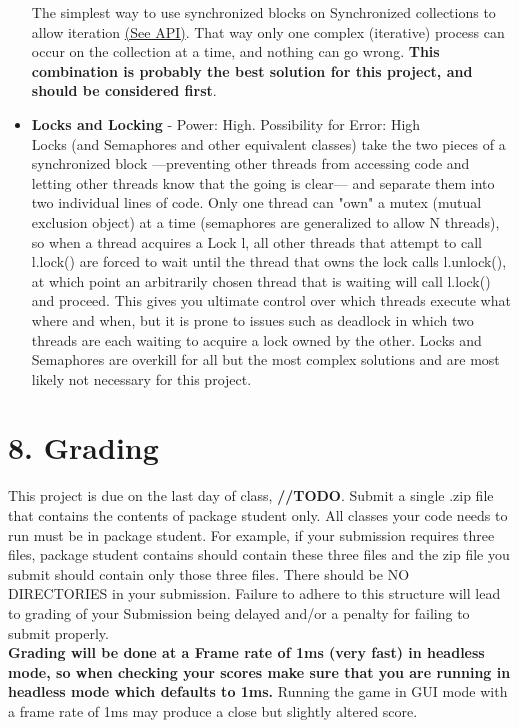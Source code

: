 \documentclass[11pt]{article}
\begin{document}
\begin{itemize}
The simplest way to use synchronized blocks on Synchronized collections to allow iteration \href{http://docs.oracle.com/javase/7/docs/api/java/util/Collections.html\#synchronizedCollection(java.util.Collection)}{({\color{blue}\underline{See API}})}. That way only one complex (iterative) process can occur on the collection at a time, and nothing can go wrong. \textbf{This combination is probably the best solution for this project, and should be considered first}.
\item \textbf{Locks and Locking} - Power: High. Possibility for Error: High\\
Locks (and Semaphores and other equivalent classes) take the two pieces of a synchronized block ---preventing other threads from accessing code and letting other threads know that the going is clear--- and separate them into two individual lines of code. Only one thread can "own" a mutex (mutual exclusion object) at a time (semaphores are generalized to allow N threads), so when a thread acquires a Lock l, all other threads that attempt to call l.lock() are forced to wait until the thread that owns the lock calls l.unlock(), at which point an arbitrarily chosen thread that is waiting will call l.lock() and proceed. This gives you ultimate control over which threads execute what where and when, but it is  prone to issues such as deadlock in which two threads are each waiting to acquire a lock owned by the other. Locks and Semaphores are overkill for all but the most complex solutions and are most likely not necessary for this project. 
\end{itemize}

\section{8. Grading}
This project is due on the last day of class, \textbf{//TODO}.
Submit a single .zip file that contains the contents of package student only. All classes your code needs to run must be in package student.  For example, if your submission requires three files, package student contains should contain these three files and the zip file you submit should contain only those three files.  There should be NO DIRECTORIES in your submission.  Failure to adhere to this structure will lead to grading of your Submission being delayed and/or a penalty for failing to submit properly.\\

\textbf{Grading will be done at a Frame rate of 1ms (very fast) in headless mode, so when checking your scores make sure that you are running in headless mode which defaults to 1ms.} Running the game  in GUI mode with a frame rate of 1ms may produce a close but slightly altered score.\\ 
\end{document}
